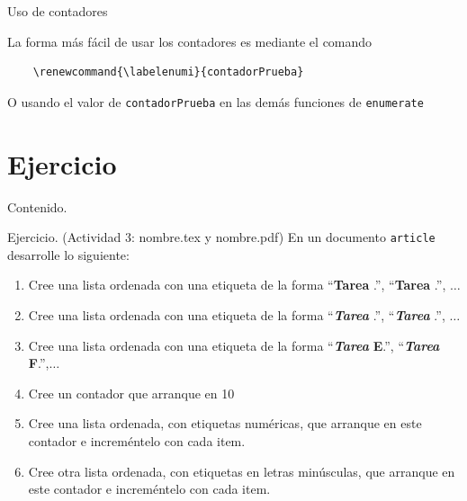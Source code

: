 \documentclass[dvipsnames,xcolor, handout]{beamer}
\newcommand*{\rom}[1]{\expandafter\romannumeral #1}
\newcommand{\Rom}[1]{\uppercase\expandafter{\romannumeral #1\relax}}
\theoremstyle{plain}
\theoremstyle{definition}
\begin{document}
\begin{frame}[fragile]{Uso de contadores}

La forma más fácil de usar los contadores es mediante el comando
\begin{small}
\begin{verbatim}
    \renewcommand{\labelenumi}{contadorPrueba}
\end{verbatim}
\end{small}

O usando el valor de \verb!contadorPrueba! en las demás funciones de \verb!enumerate!
    
\end{frame}



\section{Ejercicio}
\begin{frame}{Contenido.}
  \tableofcontents[currentsection]
\end{frame}
\begin{frame}[fragile]{Ejercicio. (Actividad 3: nombre.tex y nombre.pdf)}
En un documento \verb!article! desarrolle lo siguiente:

\begin{enumerate}
    \item Cree una lista ordenada con una etiqueta de la forma ``\textbf{Tarea} \Rom{1}.'', ``\textbf{Tarea} \Rom{2}.'', $\dots$
    
    \item Cree una lista ordenada con una etiqueta de la forma ``\textbf{\textit{Tarea}} \rom{1}.'', ``\textbf{\textit{Tarea}} \rom{2}.'', $\dots$
    
    \item Cree una lista ordenada con una etiqueta de la forma ``\textit{\textbf{Tarea}} \textbf{E}.'', ``\textbf{\textit{Tarea}} \textbf{F}.'',$\dots$
    
    \item Cree un contador que arranque en 10
    \item Cree una lista ordenada, con etiquetas numéricas, que arranque en este contador e increméntelo con cada item.
    \item Cree otra lista ordenada, con etiquetas en letras minúsculas, que arranque en este contador e increméntelo con cada item.
\end{enumerate}

\end{frame}
{
    \begin{frame}
    \vfill
    \begin{center}
    \begin{Huge}
    \end{Huge}
    \end{center}
    \vfill
     \end{frame}
}
\end{document}

